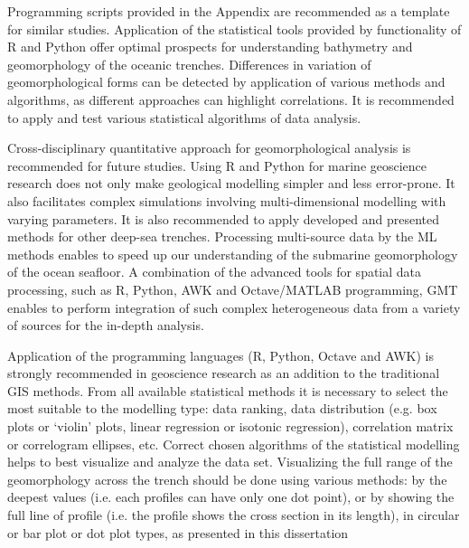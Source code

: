 \documentclass[11pt,a4paper]{report}
\begin{document}
{Programming scripts provided in the Appendix are recommended as a template for similar studies. Application of the statistical tools provided by functionality of R and Python offer optimal prospects for understanding bathymetry and geomorphology of the oceanic trenches. Differences in variation of geomorphological forms can be detected by application of various methods and algorithms, as different approaches can highlight correlations. It is recommended to apply and test various statistical algorithms of data analysis. 

Cross-disciplinary quantitative approach for geomorphological analysis is recommended for future studies. Using R and Python for marine geoscience research does not only make geological modelling simpler and less error-prone. It also facilitates complex simulations involving multi-dimensional modelling with varying parameters. It is also recommended to apply developed and presented methods for other deep-sea trenches. Processing multi-source data by the \ac{ML} methods enables to speed up our understanding of the submarine geomorphology of the ocean seafloor. A combination of the advanced tools for spatial data processing, such as R, Python, AWK and Octave/MATLAB programming, \ac{GMT} enables to perform integration of such complex heterogeneous data from a variety of sources for the in-depth analysis. 

Application of the programming languages (R, Python, Octave and AWK) is strongly recommended in geoscience research as an addition to the traditional \ac{GIS} methods. From all available statistical methods it is necessary to select the most suitable to the modelling type: data ranking, data distribution (e.g. box plots or ‘violin’ plots, linear regression or isotonic regression), correlation matrix or correlogram ellipses, etc. Correct chosen algorithms of the statistical modelling helps to best visualize and analyze the data set. Visualizing the full range of the geomorphology across the trench should be done using various methods: by the deepest values (i.e. each profiles can have only one dot point), or by showing the full line of profile (i.e. the profile shows the cross section in its length), in circular or bar plot or dot plot types, as presented in this dissertation

}
\end{document}
